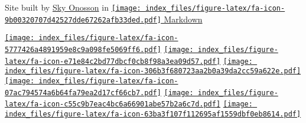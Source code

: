 \documentclass[
]{article}
\begin{document}
Site built by \href{mailto:sky@onosson.com}{Sky Onosson} in
\href{https://rmarkdown.rstudio.com/index.html}{\texttt{[image: index\_files/figure-latex/fa-icon-9b00320707d42527dde67262afb33ded.pdf]}
Markdown}

\href{mailto:sky@onosson.com}{\texttt{[image: index\_files/figure-latex/fa-icon-5777426a4891959e8c9a098fe5069ff6.pdf]}}
\href{pdf/OnossonCV.pdf}{\texttt{[image: index\_files/figure-latex/fa-icon-e71e84c2bd77dbcf0cb8f98a3ea09d57.pdf]}}
\href{https://github.com/onosson}{\texttt{[image: index\_files/figure-latex/fa-icon-306b3f680723aa2b0a39da2cc59a622e.pdf]}}
\href{https://www.researchgate.net/profile/Sky_Onosson}{\texttt{[image: index\_files/figure-latex/fa-icon-07ac794574a6b64fa79ea2d17cf66cb7.pdf]}}
\href{https://www.linkedin.com/in/sky-onosson-57902870/}{\texttt{[image: index\_files/figure-latex/fa-icon-c55c9b7eac4bc6a66901abe57b2a6c7d.pdf]}}
\href{https://twitter.com/onosson}{\texttt{[image: index\_files/figure-latex/fa-icon-63ba3f107f112695af1559dbf0eb8614.pdf]}}
\end{document}
